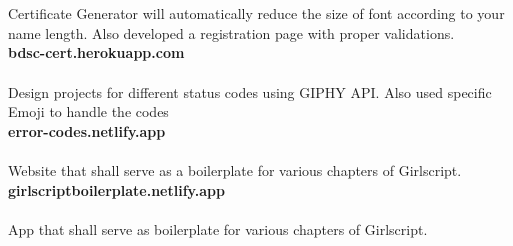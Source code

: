 \\\smallskip
{}\\\smallskip
{Certificate Generator will automatically reduce the size of font according to your name length. Also developed a registration page with proper validations.}\\\smallskip
\textbf{\small{bdsc-cert.herokuapp.com}}
\\\smallskip
{}
\\\smallskip
{Design projects for different status codes using GIPHY API.}
{Also used specific Emoji to handle the codes}\\\smallskip
{\textbf{\small{error-codes.netlify.app}}}
\\\smallskip
{}
\\\smallskip
{Website that shall serve as a boilerplate for various chapters of Girlscript.}\\\smallskip
\textbf{girlscriptboilerplate.netlify.app}
\\\smallskip
{}
\\\smallskip
{App that shall serve as boilerplate for various chapters of Girlscript.}\\\smallskip

